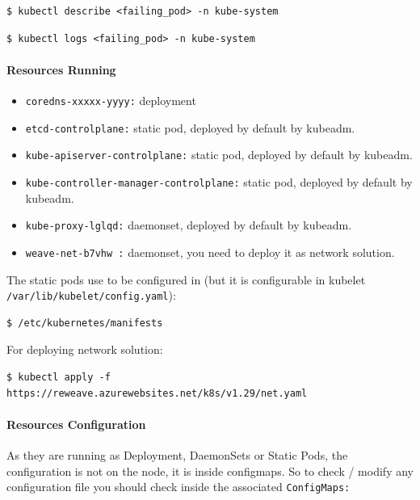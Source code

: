 \documentclass{article}
\newenvironment{codetemplate}[1][]{%
  \mybasecolorbox[#1]
  \itshape
}{%
  \endmybasecolorbox
}
\begin{document}
\begin{codetemplate}
\begin{verbatim}
$ kubectl describe <failing_pod> -n kube-system
\end{verbatim}
\end{codetemplate}

\begin{codetemplate}
\begin{verbatim}
$ kubectl logs <failing_pod> -n kube-system
\end{verbatim}
\end{codetemplate}

\paragraph{Resources Running}
\begin{itemize}
    \item \verb|coredns-xxxxx-yyyy:| deployment
    \item \verb|etcd-controlplane:| static pod, deployed by default by kubeadm.
    \item \verb|kube-apiserver-controlplane:| static pod, deployed by default by kubeadm.
    \item \verb|kube-controller-manager-controlplane:| static pod, deployed by default by kubeadm.
    \item \verb|kube-proxy-lglqd:| daemonset, deployed by default by kubeadm.
    \item \verb|weave-net-b7vhw :| daemonset, you need to deploy it as network solution.
\end{itemize}

The static pods use to be configured in (but it is configurable in kubelet \verb|/var/lib/kubelet/config.yaml|):
\begin{codetemplate}
\begin{verbatim}
$ /etc/kubernetes/manifests
\end{verbatim}
\end{codetemplate}

For deploying network solution:
\begin{codetemplate}
\begin{verbatim}
$ kubectl apply -f https://reweave.azurewebsites.net/k8s/v1.29/net.yaml
\end{verbatim}
\end{codetemplate}

\paragraph{Resources Configuration}
As they are running as Deployment, DaemonSets or Static Pods, the configuration is not on the node, it is inside configmaps. So to check / modify any configuration file you should check inside the associated \verb|ConfigMaps:|
\end{document}
